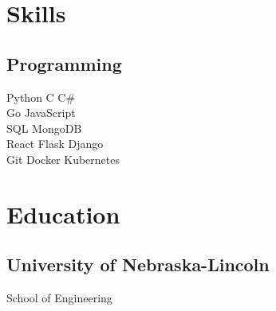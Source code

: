 \documentclass[]{latex/resume}
\begin{document}
\begin{minipage}[t]{0.25\textwidth} 


\section{Skills}
    \subsection{Programming}
                Python \textbullet{}
                C \textbullet{}
                C\#
                \\
                Go \textbullet{}
                JavaScript
                \\
        \sectionsep
                SQL \textbullet{}
                MongoDB
                \\
        \sectionsep
                React \textbullet{}
                Flask \textbullet{}
                Django 
                \\
        \sectionsep
                Git  \textbullet{}
                Docker \textbullet{}
                Kubernetes
                \\
\sectionsep


\section{Education} 
    \subsection{University of Nebraska-Lincoln}
    School of Engineering\\




\end{minipage}
\end{document}
